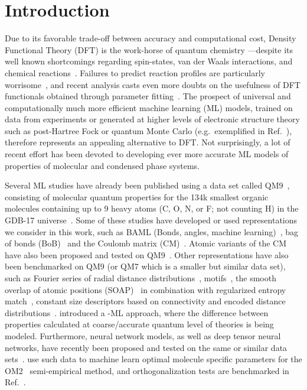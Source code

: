 \documentclass[reprint, superscriptaddress,
amsmath,amssymb, aps, prb,
]{revtex4-1}
\begin{document}
\maketitle






\section{Introduction}
Due to its favorable trade-off between accuracy and computational cost, Density Functional Theory (DFT) \cite{HK,KS} is 
the work-horse of quantum chemistry \cite{BurkePerspectives_2012jcp}---despite its well known shortcomings regarding spin-states, 
van der Waals interactions, and chemical reactions~\cite{ChemistsGuidetoDFT,CohenYang2012}. 
Failures to predict reaction profiles are particularly worrisome~\cite{SingletonDFTflawed2015}, and recent analysis casts even more doubts on the usefulness of DFT functionals obtained through parameter fitting~\cite{PerdewDFTScience2017}. 
The prospect of universal and computationally much more efficient machine learning (ML) models, trained on data from experiments or generated at higher levels of electronic structure theory such as post-Hartree Fock or quantum Monte Carlo 
(e.g.~exemplified in Ref.~\cite{delta_learning}), therefore represents an appealing alternative to DFT.
Not surprisingly, a lot of recent effort has been devoted to developing ever more accurate ML models of properties of molecular and condensed phase systems.

Several ML studies have already been published using a data set called QM9~\cite{gdb9},
consisting of molecular quantum properties for the 134k smallest organic molecules 
containing up to 9 heavy atoms (C, O, N, or F; not counting H) in the GDB-17 universe~\cite{gdb17}. 
Some of these studies have developed or used representations we  consider in this work, such as BAML (Bonds, 
angles, machine learning)~\cite{BAML}, bag of bonds (BoB)~\cite{bob,sk} and the Coulomb matrix (CM)~\cite{ML0,sk}. 
Atomic variants of the CM have also been proposed and tested on QM9~\cite{barker2016localized}.  
Other representations have also been benchmarked on QM9 (or QM7 which is a smaller but similar data set), such as 
Fourier series of radial distance distributions~\cite{OAvL_FRD}, motifs~\cite{Motif-Descriptor}, the smooth overlap of atomic positions (SOAP)~\cite{SOAP_original} in combination with regularized entropy match~\cite{SOAP_apl}, constant size descriptors based on connectivity and encoded distance distributions~\cite{const_size_desc}. 
\citet{delta_learning} introduced a -ML approach, where the difference between properties calculated at coarse/accurate quantum level of theories is being modeled. 
Furthermore, neural network models, as well as deep tensor neural networks, have recently been proposed and tested on the same or similar data sets~\cite{ANI_IsayevRoitberg2017,DeepTensorNN_2017}.
\citet{SEMIEMP_ML1} use such data to machine learn optimal molecule specific parameters for the OM2~\cite{OM2} semi-empirical method,
 and orthogonalization tests are benchmarked in Ref.~\cite{SEMIEMP_ML2}.
\end{document}
